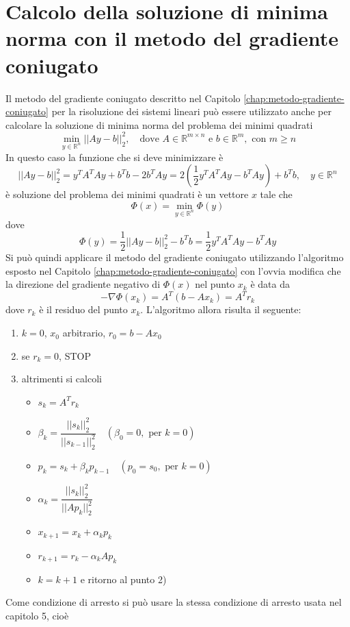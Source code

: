 \section{Calcolo della soluzione di minima norma con il
metodo del gradiente coniugato}
Il metodo del gradiente coniugato descritto nel Capitolo \ref{chap:metodo-gradiente-coniugato}
 per la risoluzione dei sistemi lineari pu\`o essere utilizzato 
anche per calcolare la soluzione 
di minima norma del problema dei minimi quadrati
$$
\displaystyle \min_{y \in \mathbb{R}^{n}}
||Ay - b||_2^{2}, \quad \text{dove } A \in
\mathbb{R}^{m \times n} \text{ e } b \in \mathbb{R}^{m}, \text{ con }
m \geq n 
$$
In questo caso la funzione che si deve minimizzare \`e
$$
||Ay - b||_2^{2} = y^T A^T Ay + b^Tb -2b^TAy = 2(\frac{1}{2}
y^{T}A^{T}A y - b^TAy) + b^Tb, \quad y \in \mathbb{R}^n 
$$
\`e soluzione del problema dei minimi quadrati \`e un vettore $x$ tale che
$$
\Phi(x) = \min_{y \in \mathbb{R}^{n}} \Phi(y)
$$
dove
$$
\Phi(y) = \frac{1}{2}||Ay-b||_2^2 - b^Tb = 
\frac{1}{2}y^TA^TAy - b^TAy
$$
Si pu\`o quindi applicare il metodo del gradiente coniugato
 utilizzando l'algoritmo esposto nel Capitolo \ref{chap:metodo-gradiente-coniugato} con
 l'ovvia modifica che la direzione del gradiente negativo di
$\Phi(x)$   nel punto $x_k$ \`e  data da
$$
-\nabla \Phi(x_k) = A^T(b-Ax_k)=A^Tr_k
$$
dove $r_k$ \`e il residuo del punto $x_k$. L'algoritmo allora risulta
il seguente:
\begin{enumerate}
\item $k=0$, $x_0$ arbitrario, $r_0 = b - Ax_0$
\item se $r_k=0$, STOP
\item altrimenti si calcoli
  \begin{itemize}
  \item $s_k = A^Tr_k$
  \item $\beta_k = \dfrac{||s_k||_2^2}{||s_{k-1}||_2^2} \quad
(\beta_0 = 0, \text{ per } k=0)$
\item $p_k = s_k + \beta_k p_{k-1} \quad (p_0 = s_0, \text{ per } k=0)$
\item $\alpha_k = \dfrac{||s_k||_2^2}{||Ap_k||_2^2} $
 \item $x_{k+1} = x_k + \alpha_k p_k$
\item $r_{k+1} = r_k - \alpha_k Ap_k$
\item $k = k+1$ e ritorno al punto 2)
  \end{itemize}
\end{enumerate}

Come condizione di arresto si pu\`o usare la stessa condizione di
 arresto usata nel capitolo 5, cio\`e

